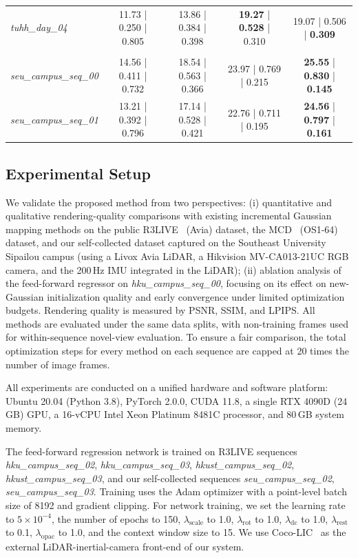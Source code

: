 \documentclass[letterpaper, 10pt, conference]{ieeeconf}
\newcommand{\datasetname}[1]{\mbox{\normalfont\itshape #1}}
\begin{document}
\begin{table}[!t]
{\begin{tabular}{lcccc}
\datasetname{tuhh\_day\_04} & 11.73 | 0.250 | 0.805 & 13.86 | 0.384 | 0.398 & \textbf{19.27} | \textbf{0.528} | 0.310 & 19.07 | 0.506 | \textbf{0.309} \\
\rowcolor{black!8}
\multicolumn{5}{l}{\textbf{Self-Collected Dataset (Avia)}} \\
\datasetname{seu\_campus\_seq\_00} & 14.56 | 0.411 | 0.732 & 18.54 | 0.563 | 0.366 & 23.97 | 0.769 | 0.215 & \textbf{25.55} | \textbf{0.830} | \textbf{0.145} \\
\datasetname{seu\_campus\_seq\_01} & 13.21 | 0.392 | 0.796 & 17.14 | 0.528 | 0.421 & 22.76 | 0.711 | 0.195 & \textbf{24.56} | \textbf{0.797} | \textbf{0.161} \\
\bottomrule
\end{tabular}%
}
\end{table}

\subsection{Experimental Setup}

We validate the proposed method from two perspectives: (i) quantitative and qualitative rendering-quality comparisons with existing incremental Gaussian mapping methods on the public R3LIVE~\cite{lin2022r} (Avia) dataset, the MCD~\cite{nguyen2024mcd} (OS1-64) dataset, and our self-collected dataset captured on the Southeast University Sipailou campus (using a Livox Avia LiDAR, a Hikvision MV-CA013-21UC RGB camera, and the 200\,Hz IMU integrated in the LiDAR); (ii) ablation analysis of the feed-forward regressor on \datasetname{hku\_campus\_seq\_00}, focusing on its effect on new-Gaussian initialization quality and early convergence under limited optimization budgets. Rendering quality is measured by PSNR, SSIM, and LPIPS. All methods are evaluated under the same data splits, with non-training frames used for within-sequence novel-view evaluation. To ensure a fair comparison, the total optimization steps for every method on each sequence are capped at 20 times the number of image frames.

All experiments are conducted on a unified hardware and software platform: Ubuntu 20.04 (Python 3.8), PyTorch 2.0.0, CUDA 11.8, a single RTX 4090D (24\,GB) GPU, a 16-vCPU Intel Xeon Platinum 8481C processor, and 80\,GB system memory.

The feed-forward regression network is trained on R3LIVE sequences \datasetname{hku\_campus\_seq\_02}, \datasetname{hku\_campus\_seq\_03}, \datasetname{hkust\_campus\_seq\_02}, \datasetname{hkust\_campus\_seq\_03}, and our self-collected sequences \datasetname{seu\_campus\_seq\_02}, \datasetname{seu\_campus\_seq\_03}. Training uses the Adam optimizer with a point-level batch size of 8192 and gradient clipping. For network training, we set the learning rate to $5\times10^{-4}$, the number of epochs to 150, $\lambda_{\text{scale}}$ to 1.0, $\lambda_{\text{rot}}$ to 1.0, $\lambda_{\text{dc}}$ to 1.0, $\lambda_{\text{rest}}$ to 0.1, $\lambda_{\text{opac}}$ to 1.0, and the context window size to 15. We use Coco-LIC~\cite{lang2023coco} as the external LiDAR-inertial-camera front-end of our system.
\end{document}
